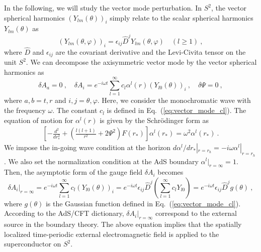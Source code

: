 \documentclass[a4paper,11pt]{article}
\begin{document}
    In the following, we will study the vector mode perturbation. 
    In $S^2$, the vector spherical harmonics $(Y_{lm}(\theta))_i$  simply relate to the scalar spherical harmonics $Y_{lm}(\theta)$ as
    \begin{equation}
        (Y_{lm}(\theta,\varphi))_i = \epsilon_{ij} \hat{D}^j Y_{lm}(\theta,\varphi)\quad(l\geq 1)\ ,
    \end{equation}
    where $\hat{D}$ and $\epsilon_{ij}$ are the covariant derivative and the Levi-Civita tensor on the unit $S^2$.
    We can decompose the axisymmetric vector mode by the vector spherical harmonics as
    \begin{equation}
        \label{eq:vector_mode_field}
        \delta A_a=0\ ,\quad
        \delta A_i = e^{-i \omega t} \sum_{l=1}^\infty c_l \alpha^{l}(r) (Y_{l0}(\theta))_i\ ,\quad
        \delta\Psi = 0\ ,
    \end{equation}
    where $a,b=t,r$ and $i,j=\theta,\varphi$. Here, we consider the monochromatic wave with the frequency $\omega$. 
    The constant $c_l$ is defined in Eq.~(\ref{eq:vector_mode_cl}). 
    The equation of motion for $\alpha^l(r)$ is given by the Schr\"{o}dinger form as
    \begin{align}
        \label{eq:vector_mode_eom}
        \left[ -\frac{d^2}{dr_*^2} + \left( \frac{l(l+1)}{r^2} + 2 \Psi^2 \right) F(r_*) \right] \alpha^{l}(r_*) = \omega^2 \alpha^{l}(r_*)\ .
    \end{align}
    We impose the in-going wave condition at the horizon $d\alpha^{l}/dr_*|_{r=r_h}=-i\omega \alpha^{l}|_{r=r_h}$.
    We also set the normalization condition at the AdS boundary $\alpha^l|_{r=\infty}=1$.
    Then, the asymptotic form of the gauge field $\delta A_i$ becomes
    \begin{equation}
        \delta A_i|_{r=\infty} =e^{-i \omega t} \sum_{l=1}^\infty c_l (Y_{l0}(\theta))_i = e^{-i \omega t}  \epsilon_{ij}\hat{D}^j (\sum_{l=1}^\infty c_l Y_{l0}) =  e^{-i \omega t}  \epsilon_{ij}\hat{D}^j g(\theta)\ ,
        \label{Avecinf}
    \end{equation}
    where $g(\theta)$ is the Gaussian function defined in Eq.~(\ref{eq:vector_mode_cl}). 
    According to the AdS/CFT dictionary, $\delta A_i|_{r=\infty}$ correspond to the external source in the boundary theory.
    The above equation implies that the spatially localized time-periodic external electromagnetic field is applied to the superconductor on $S^2$.
\end{document}
